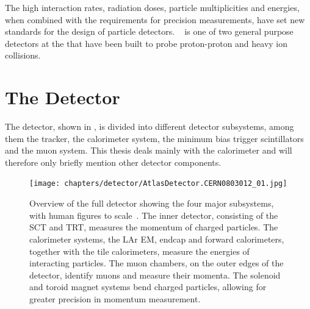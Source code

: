 The high interaction rates, radiation doses, particle multiplicities and energies, when combined with the requirements for precision measurements, have set new standards for the design of particle detectors.
\ATLAS~\cite{ATLAS:2008:detector} is one of two general purpose detectors at the \LHC that have been built to probe proton-proton and heavy ion collisions.

\section{The \ATLAS Detector}
The \ATLAS detector, shown in , is divided into different detector subsystems, among them the tracker, the calorimeter system, the minimum bias trigger scintillators and the muon system.
This thesis deals mainly with the calorimeter and will therefore only briefly mention other detector components.

\begin{figure}[htpb]
  \texttt{[image: chapters/detector/AtlasDetector.CERN0803012\_01.jpg]}
  \caption{Overview of the full \ATLAS detector showing the four major subsystems, with human figures to scale~\cite{CERN:2012:AtlasDetector}. The inner detector, consisting of the SCT and TRT, measures the momentum of charged particles. The calorimeter systems, the LAr EM, endcap and forward calorimeters, together with the tile calorimeters, measure the energies of interacting particles. The muon chambers, on the outer edges of the detector, identify muons and measure their momenta. The solenoid and toroid magnet systems bend charged particles, allowing for greater precision in momentum measurement.}
  \label{fig:detector:atlas_full_detector}
\end{figure}

